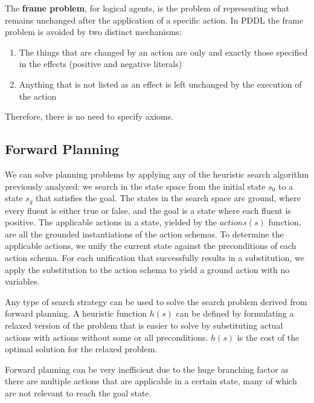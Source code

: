 \documentclass{article}
\begin{document}
The \textbf{frame problem}, for logical agents, is the problem of representing what remains unchanged after the application of a specific action. In PDDL the frame problem is avoided by two distinct mechanisms:
\begin{enumerate}
    \item The things that are changed by an action are only and exactly those specified in the effects (positive and negative literals)
    \item Anything that is not listed as an effect is left unchanged by the execution of the action
\end{enumerate}

\noindent
Therefore, there is no need to specify axioms.

\subsection{Forward Planning}
We can solve planning problems by applying any of the heuristic search algorithm previously analyzed: we search in the state space from the initial state $s_0$ to a state $s_g$ that satisfies the goal. The states in the search space are ground, where every fluent is either true or false, and the goal is a state where each fluent is positive. The applicable actions in a state, yielded by the $actions(s)$ function, are all the grounded instantiations of the action schemas. To determine the applicable actions, we unify the current state against the preconditions of each action schema. For each unification that successfully results in a substitution, we apply the substitution to the action schema to yield a ground action with no variables.

Any type of search strategy can be used to solve the search problem derived from forward planning. A heuristic function $h(s)$ can be defined by formulating a relaxed version of the problem that is easier to solve by substituting actual actions with actions without some or all preconditions. $h(s)$ is the cost of the optimal solution for the relaxed problem.

Forward planning can be very inefficient due to the huge branching factor as there are multiple actions that are applicable in a certain state, many of which are not relevant to reach the goal state.
\end{document}
